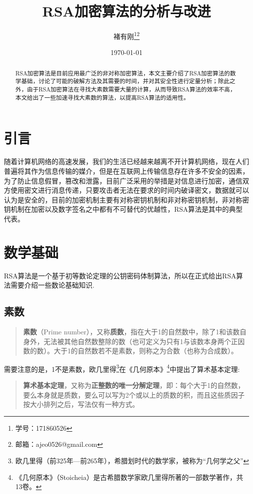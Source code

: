 \documentclass[UTF8]{ctexart}
\title{RSA加密算法的分析与改进}
\author{褚有刚\thanks{学号：171860526}\thanks{邮箱：ajeo0526@gmail.com}}
\date{\today}
\begin{document}
\maketitle %
\tableofcontents %
\begin{abstract}
	RSA加密算法是目前应用最广泛的非对称加密算法，本文主要介绍了RSA加密算法的数学基础，讨论了可能的破解方法及其需要的时间，并对其安全性进行定量分析；除此之外，由于RSA加密算法在寻找大素数需要大量的计算，从而导致RSA算法的效率不高，本文给出了一些加速寻找大素数的算法，以提高RSA算法的适用性。
\end{abstract}
\section{引言}
随着计算机网络的高速发展，我们的生活已经越来越离不开计算机网络，现在人们普遍将其作为信息传输的媒介，但是在互联网上传输信息存在许多不安全的因素，为了防止信息假冒，篡改和泄露，目前广泛采用的举措是对信息进行加密，通信双方使用密文进行消息传递，只要攻击者无法在要求的时间内破译密文，数据就可以认为是安全的，目前的加密机制主要有对称密钥机制和非对称密钥机制，非对称密钥机制在加密以及数字签名之中都有不可替代的优越性，RSA算法是其中的典型代表。

\section{数学基础}

RSA算法是一个基于初等数论定理的公钥密码体制算法，所以在正式给出RSA算法需要介绍一些数论基础知识.

\subsection{素数}

\begin{quote}
	\textbf{素数}（Prime number），又称\textbf{质数}，指在大于1的自然数中，除了1和该数自身外，无法被其他自然数整除的数（也可定义为只有1与该数本身两个正因数的数）。大于1的自然数若不是素数，则称之为合数（也称为合成数）。
\end{quote}

需要注意的是，1不是素数，欧几里得\footnote{欧几里得（前325年—前265年），希腊划时代的数学家，被称为“几何学之父”}在《几何原本》\footnote{《几何原本》（Stoicheia）是古希腊数学家欧几里得所著的一部数学著作，共13卷。}中提出了算术基本定理:

\begin{quote}
	\textbf{算术基本定理}，又称为\textbf{正整数的唯一分解定理}，即：每个大于1的自然数，要么本身就是质数，要么可以写为2个或以上的质数的积，而且这些质因子按大小排列之后，写法仅有一种方式。
\end{quote}
\end{document}
